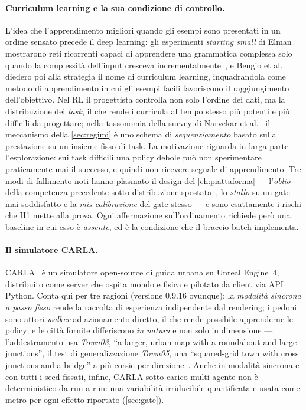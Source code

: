 \paragraph{Curriculum learning e la sua condizione di controllo.}
L'idea che l'apprendimento migliori quando gli esempi sono presentati in
un ordine sensato precede il deep learning: gli esperimenti
\emph{starting small} di Elman mostrarono reti ricorrenti capaci di
apprendere una grammatica complessa solo quando la complessità
dell'input cresceva incrementalmente~\cite{elman1993starting}, e Bengio
et al.~\cite{bengio2009curriculum} diedero poi alla strategia il nome di
curriculum learning, inquadrandola come metodo di apprendimento in cui
gli esempi facili favoriscono il raggiungimento dell'obiettivo.
Nel RL il progettista controlla non solo
l'ordine dei dati, ma la distribuzione dei \emph{task}, il che rende i
curricula al tempo stesso più potenti e più difficili da progettare;
nella tassonomia della survey di Narvekar et
al.~\cite{narvekar2020curriculum} il meccanismo della \cref{sec:regimi}
è uno schema di \emph{sequenziamento} basato sulla prestazione su un
insieme fisso di task. La motivazione riguarda in larga parte
l'esplorazione: sui task difficili una policy debole può non
sperimentare praticamente mai il successo, e quindi non ricevere segnale
di apprendimento. Tre modi di fallimento noti hanno plasmato il design
del \cref{ch:piattaforma} --- l'\emph{oblio} della competenza precedente
sotto distribuzione spostata~\cite{french1999catastrophic}, lo
\emph{stallo} su un gate mai soddisfatto e la \emph{mis-calibrazione}
del gate stesso --- e sono esattamente i rischi che H1 mette alla prova.
Ogni affermazione sull'ordinamento richiede però una baseline in cui
esso è \emph{assente}, ed è la condizione che il braccio batch
implementa.

\paragraph{Il simulatore CARLA.}
CARLA~\cite{dosovitskiy2017carla} è un simulatore open-source di guida
urbana su Unreal Engine~4, distribuito come server che ospita mondo e
fisica e pilotato da client via API Python. Conta qui per tre ragioni
(versione 0.9.16 ovunque): la \emph{modalità sincrona a passo fisso}
rende la raccolta di esperienza indipendente dal rendering; i pedoni
sono attori \emph{walker} ad azionamento diretto, il che rende possibile
apprenderne le policy; e le città fornite differiscono \emph{in natura}
e non solo in dimensione --- l'addestramento usa \emph{Town03}, ``a
larger, urban map with a roundabout and large junctions'', il test di
generalizzazione \emph{Town05}, una ``squared-grid town with cross
junctions and a bridge'' a più corsie per direzione~\cite{carladocs}.
Anche in modalità sincrona e con tutti i seed fissati, infine, CARLA
sotto carico multi-agente non è deterministico da run a run: una
variabilità irriducibile quantificata e usata come metro per ogni
effetto riportato (\cref{sec:gate}).

